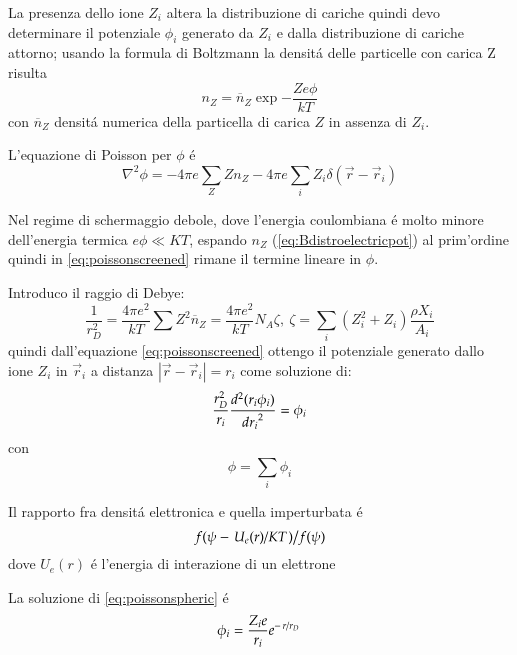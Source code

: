 \documentclass[main.tex]{subfiles}
\begin{document}
La presenza dello ione $Z_i$ altera la distribuzione di cariche quindi devo determinare il potenziale $\phi_i$ generato da $Z_i$ e dalla distribuzione di cariche attorno; usando la formula di Boltzmann la densit\'a delle particelle con carica Z risulta
\begin{equation}\label{eq:Bdistroelectricpot}
n_Z=\overline{n}_Z\exp{-\frac{Ze\phi}{kT}}
\end{equation}
con $\overline{n}_Z$ densit\'a numerica della particella di carica $Z$ in assenza di $Z_i$.

L'equazione di Poisson per $\phi$ \'e
\begin{equation}\label{eq:poissonscreened}
\nabla^2\phi=-4\pi e\sum_Z Zn_Z-4\pi e\sum_i Z_i\delta(\vec{r}-\vec{r}_i)
\end{equation}

Nel regime di schermaggio debole, dove l'energia coulombiana \'e molto minore dell'energia termica $e\phi\ll KT$, espando $n_Z$ (\eqref{eq:Bdistroelectricpot}) al prim'ordine quindi in \eqref{eq:poissonscreened} rimane il termine lineare in $\phi$.

Introduco il raggio di Debye:
\begin{equation}
\frac{1}{r_D^2}=\frac{4\pi e^2}{kT}\sum Z^2\overline{n}_Z=\frac{4\pi e^2}{kT}N_A\zeta,\ \zeta=\sum_{i}(Z_i^2+Z_i)\frac{\rho X_i}{A_i}\label{eq:debyeradius}
\end{equation}
quindi dall'equazione \eqref{eq:poissonscreened} ottengo il potenziale generato dallo ione $Z_i$ in $\vec{r}_i$ a distanza $|\vec{r}-\vec{r}_i|=r_i$ come soluzione di:
\begin{equation}\label{eq:poissonspheric}
\frac{r_D^2}{r_i}\TtwoDy{r_i}{(r_i\phi_i)}=\phi_i
\end{equation}
con
\begin{equation}
\phi=\sum_i\phi_i
\end{equation}

\begin{workout}
Il rapporto fra densit\'a elettronica e quella imperturbata \'e
\begin{equation}
\midfrac{f(\psi-\midfrac{U_e(r)}{KT})}{f(\psi)}
\end{equation}
dove $U_e(r)$ \'e l'energia di interazione di un elettrone
\end{workout}

La soluzione di \eqref{eq:poissonspheric} \'e
\begin{equation}\label{eq:screenedpotential}
\phi_i=\frac{Z_ie}{r_i}\exp{-\midfrac{r}{r_D}}
\end{equation}
\end{document}
